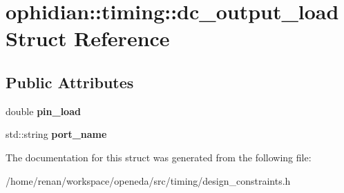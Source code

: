 \hypertarget{structophidian_1_1timing_1_1dc__output__load}{\section{ophidian\-:\-:timing\-:\-:dc\-\_\-output\-\_\-load Struct Reference}
\label{structophidian_1_1timing_1_1dc__output__load}
}
\subsection*{Public Attributes}
\begin{DoxyCompactItemize}
\item 
\hypertarget{structophidian_1_1timing_1_1dc__output__load_a4ecf6f82a611e6577bf53e694d968f3e}{double {\bfseries pin\-\_\-load}}\label{structophidian_1_1timing_1_1dc__output__load_a4ecf6f82a611e6577bf53e694d968f3e}

\item 
\hypertarget{structophidian_1_1timing_1_1dc__output__load_a499d3177b16b496b080d994d710944e9}{std\-::string {\bfseries port\-\_\-name}}\label{structophidian_1_1timing_1_1dc__output__load_a499d3177b16b496b080d994d710944e9}

\end{DoxyCompactItemize}


The documentation for this struct was generated from the following file\-:\begin{DoxyCompactItemize}
\item 
/home/renan/workspace/openeda/src/timing/design\-\_\-constraints.\-h\end{DoxyCompactItemize}
